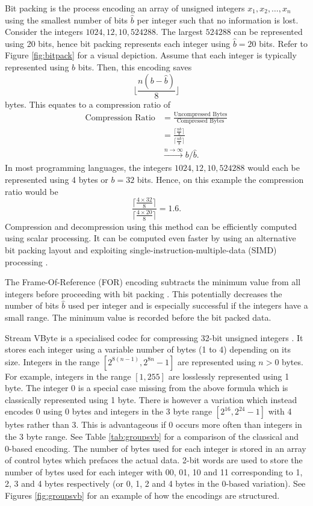 \label{sec:bitpack} Bit packing is the process encoding an array of unsigned integers $x_1, x_2, \dots, x_n$
using the smallest number of bits $\hat b$ per integer such that no information is lost.
Consider the integers $1024,12,10,\num{524288}$. The largest $\num{524288}$ can be represented using 20 bits, hence bit packing represents each integer using $\hat b = 20$ bits. Refer to Figure \ref{fig:bitpack} for a visual depiction.
Assume that each integer is typically represented using $b$ bits.
Then, this encoding saves
\[\lfloor \frac{n(b-\hat b)}{8}\rfloor\]
bytes. This equates to a compression ratio of
\begin{align*}
	\text{Compression Ratio} &= \frac{\text{Uncompressed Bytes}}{\text{Compressed Bytes}}\\
	&= \frac{\lceil \frac{nb}{8}\rceil}{\lceil \frac{n\hat b}{8}\rceil}\\
	&\stackrel{n\to\infty}{\longrightarrow}b/\hat b.
\end{align*}
In most programming languages, the integers $1024,12,10,\num{524288}$ would each be represented using 4 bytes or $b=32$ bits.
Hence, on this example the compression ratio would be
\[\frac{\lceil \frac{4 \times 32}{8}\rceil}{\lceil \frac{4 \times 20}{8}\rceil} = 1.6.\]
Compression and decompression using this method can be efficiently computed using scalar processing.
It can be computed even faster by using an alternative bit packing layout and exploiting single-instruction-multiple-data (SIMD) processing  \cite{lemire-simd}.



The Frame-Of-Reference (FOR) encoding subtracts the minimum value from all
integers before proceeding with bit packing \cite{for}. This potentially decreases the
number of bits $\hat b$ used per integer and is especially successful if the
integers have a small range. The minimum value is recorded before the bit packed
data.

\label{subsubsec:svb}
Stream VByte is a specialised codec for compressing 32-bit unsigned integers \cite{svb}. It stores each integer using a variable number of bytes (1 to 4) depending on its size. Integers in the range $[2^{8(n-1)},2^{8n}-1]$ are represented using $n>0$ bytes. For example, integers in the range $[1,255]$ are losslessly represented using 1 byte. The integer 0 is a special case missing from the above formula which is classically represented using 1 byte. There is however a variation which instead encodes 0 using 0 bytes and integers in the 3 byte range $[2^{16},2^{24}-1]$ with 4 bytes rather than 3. This is advantageous if 0 occurs more often than integers in the 3 byte range. See Table \ref{tab:groupsvb} for a comparison of the classical and 0-based encoding. The number of bytes used for each integer is stored in an array of control bytes which prefaces the actual data. 2-bit words are used to store the number of bytes used for each integer with 00, 01, 10 and 11 corresponding to 1, 2, 3 and 4 bytes respectively (or 0, 1, 2 and 4 bytes in the 0-based variation). See Figures \ref{fig:groupsvb} for an example of how the encodings are structured.

